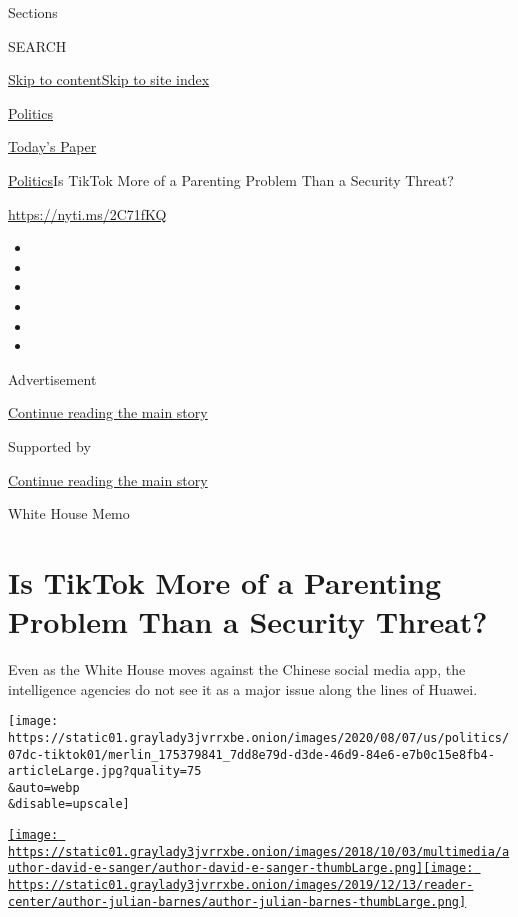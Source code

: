 Sections

SEARCH

\protect\hyperlink{site-content}{Skip to
content}\protect\hyperlink{site-index}{Skip to site index}

\href{https://www.nytimes3xbfgragh.onion/section/politics}{Politics}

\href{https://myaccount.nytimes3xbfgragh.onion/auth/login?response_type=cookie\&client_id=vi}{}

\href{https://www.nytimes3xbfgragh.onion/section/todayspaper}{Today's
Paper}

\href{/section/politics}{Politics}\textbar{}Is TikTok More of a
Parenting Problem Than a Security Threat?

\href{https://nyti.ms/2C71fKQ}{https://nyti.ms/2C71fKQ}

\begin{itemize}
\item
\item
\item
\item
\item
\item
\end{itemize}

Advertisement

\protect\hyperlink{after-top}{Continue reading the main story}

Supported by

\protect\hyperlink{after-sponsor}{Continue reading the main story}

White House Memo

\hypertarget{is-tiktok-more-of-a-parenting-problem-than-a-security-threat}{%
\section{Is TikTok More of a Parenting Problem Than a Security
Threat?}\label{is-tiktok-more-of-a-parenting-problem-than-a-security-threat}}

Even as the White House moves against the Chinese social media app, the
intelligence agencies do not see it as a major issue along the lines of
Huawei.

\texttt{[image: https://static01.graylady3jvrrxbe.onion/images/2020/08/07/us/politics/07dc-tiktok01/merlin\_175379841\_7dd8e79d-d3de-46d9-84e6-e7b0c15e8fb4-articleLarge.jpg?quality=75\\\&auto=webp\\\&disable=upscale]}

\href{https://www.nytimes3xbfgragh.onion/by/david-e-sanger}{\texttt{[image: https://static01.graylady3jvrrxbe.onion/images/2018/10/03/multimedia/author-david-e-sanger/author-david-e-sanger-thumbLarge.png]}}\href{https://www.nytimes3xbfgragh.onion/by/julian-e-barnes}{\texttt{[image: https://static01.graylady3jvrrxbe.onion/images/2019/12/13/reader-center/author-julian-barnes/author-julian-barnes-thumbLarge.png]}}

